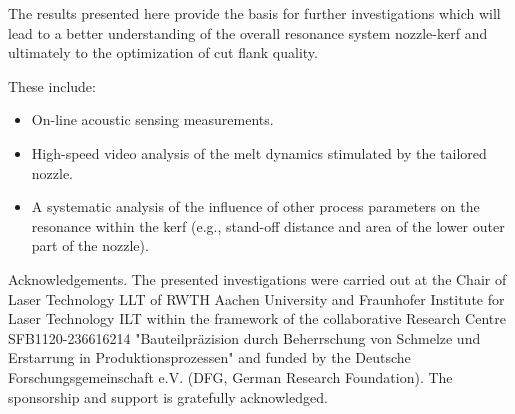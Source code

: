 \documentclass[10pt]{article}
\begin{document}
The results presented here provide the basis for further investigations which will lead to a better understanding of the overall resonance system nozzle-kerf and ultimately to the optimization of cut flank quality.

These include:

\begin{itemize}
  \item On-line acoustic sensing measurements.

  \item High-speed video analysis of the melt dynamics stimulated by the tailored nozzle.

  \item A systematic analysis of the influence of other process parameters on the resonance within the kerf (e.g., stand-off distance and area of the lower outer part of the nozzle).

\end{itemize}

Acknowledgements. The presented investigations were carried out at the Chair of Laser Technology LLT of RWTH Aachen University and Fraunhofer Institute for Laser Technology ILT within the framework of the collaborative Research Centre SFB1120-236616214 "Bauteilpräzision durch Beherrschung von Schmelze und Erstarrung in Produktionsprozessen" and funded by the Deutsche Forschungsgemeinschaft e.V. (DFG, German Research Foundation). The sponsorship and support is gratefully acknowledged.
\end{document}
